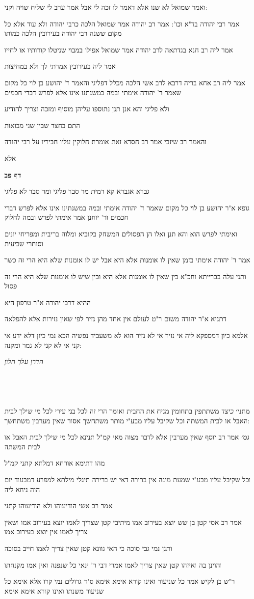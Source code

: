 \documentclass[12pt, openany]{book}
\newcommand{\sethebfont}{
\fontsize{10.5pt}{21.0pt} \selectfont
}
\newcommand{\textblock}[1]{
{\sethebfont #1\\}	
}
\newcommand{\sectname}{}
\newcommand{\newsection}[1]{
	\addcontentsline{toc}{section}{#1}
	\renewcommand{\sectname}{#1}	
	\vspace{-\baselineskip}
	\begin{center}
		\textbf{%
\fontsize{16pt}{16pt}\selectfont
			#1}
	\end{center}
	\vspace{-\baselineskip}
	\nopagebreak
}
\begin{document}
\textblock{ואמר שמואל לא שנו אלא דאמר לו זכה לי אבל אמר ערב לי שליח שויה וקני:}
\textblock{אמר רבי יהודה בד"א וכו': אמר רב יהודה אמר שמואל הלכה כרבי יהודה ולא עוד אלא כל מקום ששנה רבי יהודה בעירובין הלכה כמותו}
\textblock{אמר ליה רב חנא בגדתאה לרב יהודה אמר שמואל אפילו במבוי שניטלו קורותיו או לחייו}
\textblock{אמר ליה בעירובין אמרתי לך ולא במחיצות}
\textblock{אמר ליה רב אחא בריה דרבא לרב אשי הלכה מכלל דפליגי והאמר ר' יהושע בן לוי כל מקום שאמר ר' יהודה אימתי ובמה במשנתנו אינו אלא לפרש דברי חכמים}
\textblock{ולא פליגי והא אנן תנן נתוספו עליהן מוסיף ומזכה וצריך להודיע}
\textblock{התם בחצר שבין שני מבואות}
\textblock{והאמר רב שיזבי אמר רב חסדא זאת אומרת חלוקין עליו חביריו על רבי יהודה}
\textblock{אלא}
\newsection{דף פב}
\textblock{גברא אגברא קא רמית מר סבר פליגי ומר סבר לא פליגי}
\textblock{גופא א"ר יהושע בן לוי כל מקום שאמר ר' יהודה אימתי ובמה במשנתינו אינו אלא לפרש דברי חכמים ור' יוחנן אמר אימתי לפרש ובמה לחלוק}
\textblock{ואימתי לפרש הוא והא תנן ואלו הן הפסולים המשחק בקוביא ומלוה בריבית ומפריחי יונים וסוחרי שביעית}
\textblock{אמר ר' יהודה אימתי בזמן שאין לו אומנות אלא היא אבל יש לו אומנות שלא היא הרי זה כשר}
\textblock{ותני עלה בברייתא וחכ"א בין שאין לו אומנות אלא היא ובין שיש לו אומנות שלא היא הרי זה פסול}
\textblock{ההיא דרבי יהודה א"ר טרפון היא}
\textblock{דתניא א"ר יהודה משום ר"ט לעולם אין אחד מהן נזיר לפי שאין נזירות אלא להפלאה}
\textblock{אלמא כיון דמספקא ליה אי נזיר אי לא נזיר הוא לא משעביד נפשיה הכא נמי כיון דלא ידע אי קני אי לא קני לא גמר ומקנה:}
\textblock{\par \par {\large\emph{הדרן עלך חלון}}\par \par }
\textblock{}
\textblock{מתני׳ {\large\emph{כיצד}} משתתפין בתחומין מניח את החבית ואומר הרי זה לכל בני עירי לכל מי שילך לבית האבל או לבית המשתה וכל שקיבל עליו מבע"י מותר משתחשך אסור שאין מערבין משתחשך:}
\textblock{{\large\emph{גמ׳}} אמר רב יוסף שאין מערבין אלא לדבר מצוה מאי קמ"ל תנינא לכל מי שילך לבית האבל או לבית המשתה}
\textblock{מהו דתימא אורחא דמלתא קתני קמ"ל}
\textblock{וכל שקיבל עליו מבע"י שמעת מינה אין ברירה דאי יש ברירה תיגלי מילתא למפרע דמבעוד יום הוה ניחא ליה}
\textblock{אמר רב אשי הודיעוהו ולא הודיעוהו קתני}
\textblock{אמר רב אסי קטן בן שש יוצא בעירוב אמו מיתיבי קטן שצריך לאמו יוצא בעירוב אמו ושאין צריך לאמו אין יוצא בעירוב אמו}
\textblock{ותנן נמי גבי סוכה כי האי גוונא קטן שאין צריך לאמו חייב בסוכה}
\textblock{והוינן בה ואיזהו קטן שאין צריך לאמו אמרי דבי ר' ינאי כל שנפנה ואין אמו מקנחתו}
\textblock{ר"ש בן לקיש אמר כל שניעור ואינו קורא אימא אימא ס"ד גדולים נמי קרו אלא אימא כל שניעור משנתו ואינו קורא אימא אימא}
\end{document}
